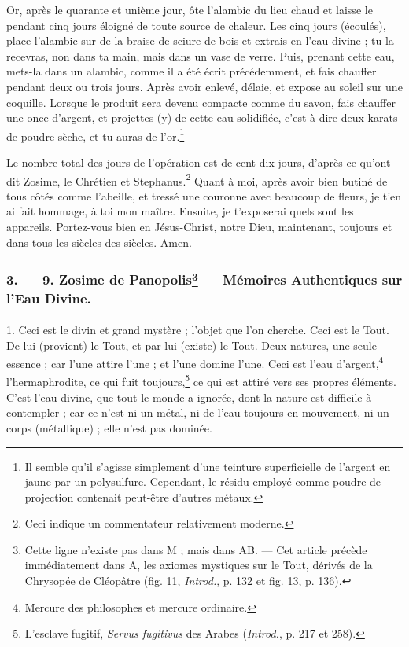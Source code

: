 \documentclass[landscape, a4paper, 11pt, oneside, polutonikogreek, french]{article}
\begin{document}
Or, après le quarante et unième jour, ôte l'alambic du lieu chaud et laisse le pendant cinq jours éloigné de toute source de chaleur. Les cinq jours (écoulés), place l'alambic sur de la braise de sciure de bois et extrais-en l'eau divine ; tu la recevras, non dans ta main, mais dans un vase de verre. Puis, prenant cette eau, mets-la dans un alambic, comme il a été écrit précédemment, et fais chauffer pendant deux ou trois jours. Après avoir enlevé, délaie, et expose au soleil sur une coquille. Lorsque le produit sera devenu compacte comme du savon, fais chauffer une once d'argent, et projettes (y) de cette eau solidifiée, c'est-à-dire deux karats de poudre sèche, et tu auras de l'or.\footnote{Il semble qu'il s'agisse simplement d'une teinture superficielle de l'argent en jaune par un polysulfure. Cependant, le résidu employé comme poudre de projection contenait peut-être d'autres métaux.}

Le nombre total des jours de l'opération est de cent dix jours, d'après ce qu'ont dit Zosime, le Chrétien et Stephanus.\footnote{Ceci indique un commentateur relativement moderne.} Quant à moi, après avoir bien butiné de tous côtés comme l'abeille, et tressé une couronne avec beaucoup de fleurs, je t'en ai fait hommage, à toi mon maître. Ensuite, je t'exposerai quels sont les appareils. Portez-vous bien en Jésus-Christ, notre Dieu, maintenant, toujours et dans tous les siècles des siècles. Amen.

\bigskip
\centerline{\EightStarTaper}
\centerline{\EightStarTaper\EightStarTaper}
\bigskip

\subsubsection[3. --- 9. Zosime de Panopolis --- Mémoires Authentiques sur l'Eau Divine.]{3. --- 9. Zosime de Panopolis\footnote{Cette ligne n'existe pas dans M ; mais dans AB. --- Cet article précède immédiatement dans A, les axiomes mystiques sur le Tout, dérivés de la Chrysopée de Cléopâtre (fig. 11, \emph{Introd.}, p. 132 et fig. 13, p. 136).} --- Mémoires Authentiques sur l'Eau Divine.}
\paragraph{}
1. Ceci est le divin et grand mystère ; l'objet que l'on cherche. Ceci est le Tout. De lui (provient) le Tout, et par lui (existe) le Tout. Deux natures, une seule essence ; car l'une attire l'une ; et l'une domine l'une. Ceci est l'eau d'argent,\footnote{Mercure des philosophes et mercure ordinaire.} l'hermaphrodite, ce qui fuit toujours,\footnote{L'esclave fugitif, \emph{Servus fugitivus} des Arabes (\emph{Introd.}, p. 217 et 258).} ce qui est attiré vers ses propres éléments. C'est l'eau divine, que tout le monde a ignorée, dont la nature est difficile à contempler ; car ce n'est ni un métal, ni de l'eau toujours en mouvement, ni un corps (métallique) ; elle n'est pas dominée.
\end{document}
